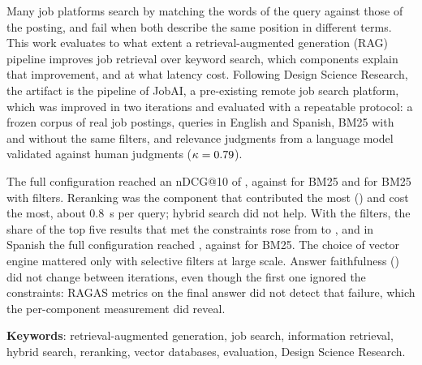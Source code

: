 Many job platforms search by matching the words of the query against those of the posting, and fail when both describe the same position in different terms. This work evaluates to what extent a retrieval-augmented generation (RAG) pipeline improves job retrieval over keyword search, which components explain that improvement, and at what latency cost. Following Design Science Research, the artifact is the pipeline of JobAI, a pre-existing remote job search platform, which was improved in two iterations and evaluated with a repeatable protocol: a frozen corpus of \cOfertasEn{} real job postings, \cConsultasPrueba{} queries in English and Spanish, BM25 with and without the same filters, and relevance judgments from a language model validated against human judgments ($\kappa = \mbox{0.79}$).

The full configuration reached an nDCG@10 of \cNdcgCompletaEn, against \cNdcgBMEn{} for BM25 and \cNdcgBMFiltrosEn{} for BM25 with filters. Reranking was the component that contributed the most (\cDifReordEnTres) and cost the most, about 0.8~s per query; hybrid search did not help. With the filters, the share of the top five results that met the constraints rose from \cCumplDensoEn{} to \cCumplFiltrosEn, and in Spanish the full configuration reached \cNdcgCompletaEsEn, against \cNdcgBMEsEn{} for BM25. The choice of vector engine mattered only with selective filters at large scale. Answer faithfulness (\cFidelidadEn) did not change between iterations, even though the first one ignored the constraints: RAGAS metrics on the final answer did not detect that failure, which the per-component measurement did reveal.

\textbf{Keywords}: retrieval-augmented generation, job search, information retrieval, hybrid search, reranking, vector databases, evaluation, Design Science Research.
